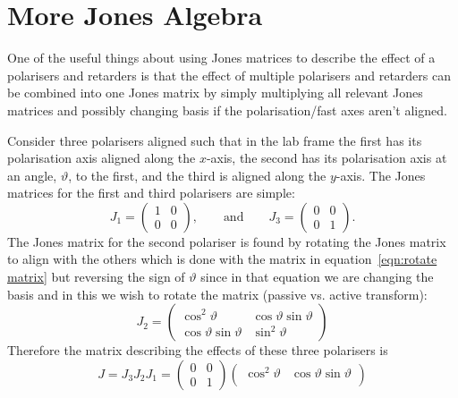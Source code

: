     
    \section{More Jones Algebra}
    One of the useful things about using Jones matrices to describe the effect of a polarisers and retarders is that the effect of multiple polarisers and retarders can be combined into one Jones matrix by simply multiplying all relevant Jones matrices and possibly changing basis if the polarisation/fast axes aren't aligned.
    
    \begin{example}
        Consider three polarisers aligned such that in the lab frame the first has its polarisation axis aligned along the \(x\)-axis, the second has its polarisation axis at an angle, \(\vartheta\), to the first, and the third is aligned along the \(y\)-axis.
        The Jones matrices for the first and third polarisers are simple:
        \[
            J_1 = 
            \begin{pmatrix}
                1 & 0\\
                0 & 0
            \end{pmatrix}
            ,\qquad\text{and}\qquad J_3 =
            \begin{pmatrix}
                0 & 0\\
                0 & 1
            \end{pmatrix}
            .
        \]
        The Jones matrix for the second polariser is found by rotating the Jones matrix to align with the others which is done with the matrix in equation~\ref{eqn:rotate matrix} but reversing the sign of \(\vartheta\) since in that equation we are changing the basis and in this we wish to rotate the matrix (passive vs. active transform):
        \[
            J_2 = 
            \begin{pmatrix}
                \cos^2\vartheta & \cos\vartheta\sin\vartheta\\
                \cos\vartheta\sin\vartheta & \sin^2\vartheta
            \end{pmatrix}
        \]
        Therefore the matrix describing the effects of these three polarisers is
        \[
            J = J_3J_2J_1 =
            \begin{pmatrix}
                0 & 0\\
                0 & 1
            \end{pmatrix}
            \begin{pmatrix}
                \cos^2\vartheta & \cos\vartheta\sin\vartheta\\

\end{pmatrix}\]
\end{example}
